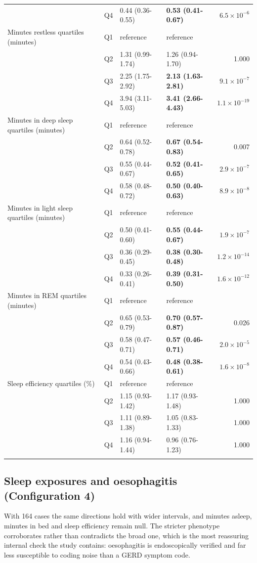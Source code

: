 \documentclass[11pt]{article}
\begin{document}
\begin{longtable}{@{}p{5.2cm}c p{3.0cm} p{3.0cm} r@{}}
 & Q4 & 0.44 (0.36-0.55) & \textbf{0.53 (0.41-0.67)} & $6.5\times10^{-6}$ \\
\addlinespace
Minutes restless quartiles (minutes) & Q1 & reference & reference & \\
 & Q2 & 1.31 (0.99-1.74) & 1.26 (0.94-1.70) & 1.000 \\
 & Q3 & 2.25 (1.75-2.92) & \textbf{2.13 (1.63-2.81)} & $9.1\times10^{-7}$ \\
 & Q4 & 3.94 (3.11-5.03) & \textbf{3.41 (2.66-4.43)} & $1.1\times10^{-19}$ \\
\addlinespace
Minutes in deep sleep quartiles (minutes) & Q1 & reference & reference & \\
 & Q2 & 0.64 (0.52-0.78) & \textbf{0.67 (0.54-0.83)} & 0.007 \\
 & Q3 & 0.55 (0.44-0.67) & \textbf{0.52 (0.41-0.65)} & $2.9\times10^{-7}$ \\
 & Q4 & 0.58 (0.48-0.72) & \textbf{0.50 (0.40-0.63)} & $8.9\times10^{-8}$ \\
\addlinespace
Minutes in light sleep quartiles (minutes) & Q1 & reference & reference & \\
 & Q2 & 0.50 (0.41-0.60) & \textbf{0.55 (0.44-0.67)} & $1.9\times10^{-7}$ \\
 & Q3 & 0.36 (0.29-0.45) & \textbf{0.38 (0.30-0.48)} & $1.2\times10^{-14}$ \\
 & Q4 & 0.33 (0.26-0.41) & \textbf{0.39 (0.31-0.50)} & $1.6\times10^{-12}$ \\
\addlinespace
Minutes in REM quartiles (minutes) & Q1 & reference & reference & \\
 & Q2 & 0.65 (0.53-0.79) & \textbf{0.70 (0.57-0.87)} & 0.026 \\
 & Q3 & 0.58 (0.47-0.71) & \textbf{0.57 (0.46-0.71)} & $2.0\times10^{-5}$ \\
 & Q4 & 0.54 (0.43-0.66) & \textbf{0.48 (0.38-0.61)} & $1.6\times10^{-8}$ \\
\addlinespace
Sleep efficiency quartiles (\%) & Q1 & reference & reference & \\
 & Q2 & 1.15 (0.93-1.42) & 1.17 (0.93-1.48) & 1.000 \\
 & Q3 & 1.11 (0.89-1.38) & 1.05 (0.83-1.33) & 1.000 \\
 & Q4 & 1.16 (0.94-1.44) & 0.96 (0.76-1.23) & 1.000 \\
\addlinespace
\bottomrule \end{longtable}

\subsection{Sleep exposures and oesophagitis (Configuration 4)}
With 164 cases the same directions hold with wider intervals, and minutes asleep, minutes in
bed and sleep efficiency remain null. The stricter phenotype corroborates rather than
contradicts the broad one, which is the most reassuring internal check the study contains:
oesophagitis is endoscopically verified and far less susceptible to coding noise than a GERD
symptom code.
\end{document}
